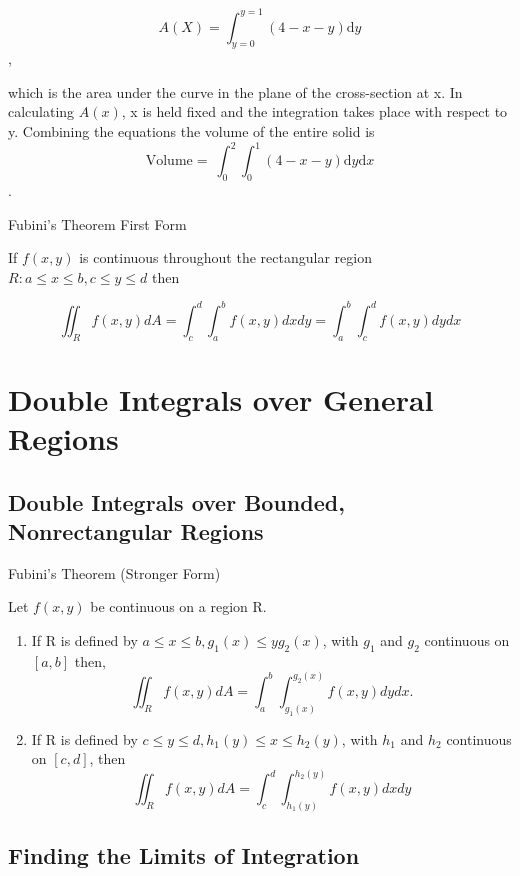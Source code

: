\documentclass[12pt,a4paper,draft]{article}
\newenvironment{ruleBox}[1]{\begin{rulebox}{#1}}{\end{rulebox}\vspace{1\baselineskip}}
\begin{document}
\[A(X) = \int_{y=0}^{y=1}(4 - x - y)\mathrm{d}y\],

which is the area under the curve in the plane of the cross-section at x. In calculating \(A(x)\), x is held fixed and the integration takes place with respect to y. Combining the equations the volume of the entire solid is
\[\text{Volume}= \ \int_{0}^{2} \int_{0}^{1}(4 - x - y) \mathrm{d}y\mathrm{d}x\].


\begin{ruleBox}{Fubini's Theorem First Form}

    If \(f(x,y)\) is continuous throughout the rectangular region \(R: a \leq x \leq b, c \leq y \leq d\) then

    \[\iint_R f(x, y) d A=\int_c^d \int_a^b f(x, y) d x d y=\int_a^b \int_c^d f(x, y) d y d x\]

\end{ruleBox}

\section{Double Integrals over General Regions}

\subsection{Double Integrals over Bounded, Nonrectangular Regions}
\begin{ruleBox}{Fubini's Theorem (Stronger Form)}

    Let \(f(x,y)\) be continuous on a region R. 

    \begin{enumerate}
        \item If R is defined by \(a \leq x \leq b, g_1(x) \leq y g_2(x)\), with \(g_1\) and \(g_2\) continuous on \([a,b]\) then, \[\iint_R f(x, y) d A=\int_a^b \int_{g_1(x)}^{g_2(x)} f(x, y) d y d x .\]
        \item If R is defined by \(c \leq y \leq d, h_1(y) \leq x \leq h_2(y)\), with \(h_1\) and \(h_2\) continuous on \([c,d]\), then \[\iint_R f(x, y) d A=\int_c^d \int_{h_1(y)}^{h_2(y)} f(x, y) d x d y\]
    \end{enumerate}
    
\end{ruleBox}

\subsection{Finding the Limits of Integration}
\end{document}
